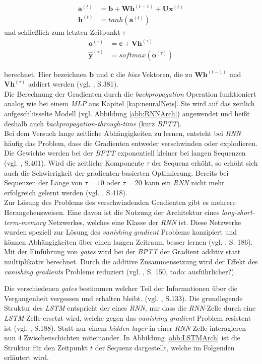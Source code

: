\documentclass[a4paper,11pt]{article}
\begin{document}
\begin{align*}
    \bm{a}^{(t)} &= \bm{b} + \bm{W} \bm{h}^{(t-1)} + \bm{U}\bm{x}^{(t)} \\
    \bm{h}^{(t)} &= tanh(\bm{a}^{(t)}) 
\end{align*}
    und schließlich zum letzten Zeitpunkt $\tau$
\begin{align*}
    \bm{o}^{(\tau)} &= \bm{c} + \bm{V}\bm{h}^{(\tau)} \\
    \bm{\hat{y}}^{(\tau)} &= softmax(\bm{o}^{(\tau)})
\end{align*}

berechnet. Hier bezeichnen $\bm{b}$ und $\bm{c}$ die \textit{bias} Vektoren, die zu $\bm{W} \bm{h}^{(t-1)} $ und $\bm{V}\bm{h}^{(\tau)} $ addiert werden (vgl. \cite{deepL}, S.381).\\
Die Berechnung der Gradienten durch die \textit{backpropagation} Operation funktioniert analog wie bei einem \textit{MLP} aus Kapitel \ref{kap:neuralNets}. Sie wird auf das zeitlich aufgeschlüsselte Modell (vgl. Abbildung \ref{abb:RNNArch}) angewendet und heißt deshalb auch \textit{backpropagation-through-time} (kurz \textit{BPTT}). \\
Bei dem Versuch lange zeitliche Abhängigkeiten zu lernen, entsteht bei \textit{RNN} häufig das Problem, dass die Gradienten entweder verschwinden oder explodieren. 
Die Gewichte werden bei der \textit{BPTT} exponentiell kleiner bei langen Sequenzen (vgl. \cite{deepL}, S.401). Wird die zeitliche Komponente $\tau$ der Sequenz erhöht, so erhöht sich auch die Schwierigkeit der gradienten-basierten Optimierung.
Bereits bei Sequenzen der Länge von $\tau = 10$ oder $\tau = 20$ kann ein \textit{RNN} nicht mehr erfolgreich gelernt werden (vgl. \cite{deepL}, S.418).\\

Zur Lösung des Problems des verschwindenden Gradienten gibt es mehrere Herangehensweisen. Eine davon ist die Nutzung der Architektur eines \textit{long-short-term-memory} Netzwerkes, welches eine Klasse der \textit{RNN} ist. Diese Netzwerke wurden speziell zur Lösung des \textit{vanishing gradient} Problems konzipiert und können Abhängigkeiten über einen langen Zeitraum besser lernen (vgl. \cite{keras}, S. 186). Mit der Einführung von \textit{gates} wird bei der \textit{BPTT} der Gradient additiv statt multiplikativ berechnet. Durch die additive Zusammensetzung wird der Effekt des \textit{vanishing gradients} Problems reduziert (vgl. \cite{deepEssentials}, S. 150, todo: ausführlicher?).

Die verschiedenen \textit{gates} bestimmen welcher Teil der Informationen über die Vergangenheit vergessen und erhalten bleibt. (vgl. \cite{deepNLP}, S.133). Die grundlegende Struktur des \textit{LSTM} entspricht der eines \textit{RNN}, nur dass die \textit{RNN}-Zelle durch eine \textit{LSTM}-Zelle ersetzt wird, welche gegen das \textit{vanishing gradient} Problem resistent ist (vgl. \cite{keras}, S.188). Statt nur einem \textit{hidden layer} in einer \textit{RNN}-Zelle interagieren nun $4$ Zwischenschichten miteinander. In Abbildung \ref{abb:LSTMArch} ist die Struktur für den Zeitpunkt $t$ der Sequenz dargestellt, welche im Folgenden erläutert wird.
\end{document}
